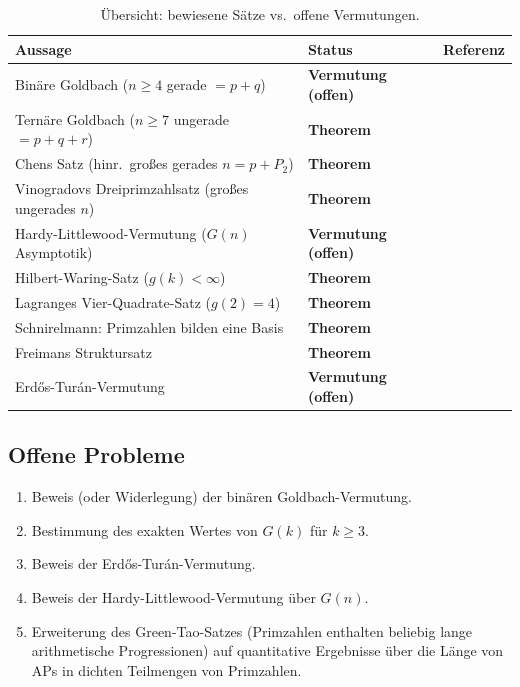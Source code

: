\documentclass[12pt,a4paper]{amsart}
\theoremstyle{definition}
\begin{document}
\begin{table}[h]
\centering
\begin{tabular}{@{}p{7cm}ll@{}}
\toprule
Aussage & Status & Referenz \\
\midrule
Bin\"{a}re Goldbach ($n \geq 4$ gerade $= p + q$) &
  \textbf{Vermutung (offen)} & \cite{Goldbach1742} \\
Tern\"{a}re Goldbach ($n \geq 7$ ungerade $= p+q+r$) &
  \textbf{Theorem} & \cite{Helfgott2013} \\
Chens Satz (hinr.\ gro\ss{}es gerades $n = p + P_2$) &
  \textbf{Theorem} & \cite{Chen1973} \\
Vinogradovs Dreiprimzahlsatz (gro\ss{}es ungerades $n$) &
  \textbf{Theorem} & \cite{Vinogradov1937} \\
Hardy-Littlewood-Vermutung ($G(n)$ Asymptotik) &
  \textbf{Vermutung (offen)} & \cite{HardyLittlewood1923} \\
Hilbert-Waring-Satz ($g(k) < \infty$) &
  \textbf{Theorem} & \cite{Hilbert1909} \\
Lagranges Vier-Quadrate-Satz ($g(2) = 4$) &
  \textbf{Theorem} & \cite{Lagrange1770} \\
Schnirelmann: Primzahlen bilden eine Basis &
  \textbf{Theorem} & \cite{Schnirelmann1930} \\
Freimans Struktursatz &
  \textbf{Theorem} & \cite{Freiman1973} \\
Erd\H{o}s-Tur\'{a}n-Vermutung &
  \textbf{Vermutung (offen)} & \cite{ErdosTuran1941} \\
\bottomrule
\end{tabular}
\caption{\"{U}bersicht: bewiesene S\"{a}tze vs.\ offene Vermutungen.}
\label{tab:status}
\end{table}

\subsection*{Offene Probleme}
\begin{enumerate}[label=(\arabic*)]
\item Beweis (oder Widerlegung) der bin\"{a}ren Goldbach-Vermutung.
\item Bestimmung des exakten Wertes von $G(k)$ f\"{u}r $k \geq 3$.
\item Beweis der Erd\H{o}s-Tur\'{a}n-Vermutung.
\item Beweis der Hardy-Littlewood-Vermutung \"{u}ber $G(n)$.
\item Erweiterung des Green-Tao-Satzes (Primzahlen enthalten beliebig
      lange arithmetische Progressionen) auf quantitative Ergebnisse
      \"{u}ber die L\"{a}nge von APs in dichten Teilmengen von Primzahlen.
\end{enumerate}
\end{document}
